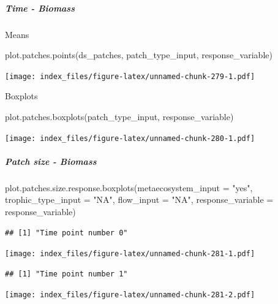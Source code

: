 \documentclass[
]{article}
\newenvironment{Shaded}{\begin{snugshade}}{\end{snugshade}}
\newcommand{\AttributeTok}[1]{\textcolor[rgb]{0.77,0.63,0.00}{#1}}
\newcommand{\FunctionTok}[1]{\textcolor[rgb]{0.00,0.00,0.00}{#1}}
\newcommand{\NormalTok}[1]{#1}
\newcommand{\StringTok}[1]{\textcolor[rgb]{0.31,0.60,0.02}{#1}}
\begin{document}
\hypertarget{time---biomass-1}{%
\subparagraph{Time - Biomass}\label{time---biomass-1}}

Means

\begin{Shaded}
\begin{Highlighting}[]
\FunctionTok{plot.patches.points}\NormalTok{(ds\_patches, patch\_type\_input,}
\NormalTok{                    response\_variable)}
\end{Highlighting}
\end{Shaded}

\texttt{[image: index\_files/figure-latex/unnamed-chunk-279-1.pdf]}

Boxplots

\begin{Shaded}
\begin{Highlighting}[]
\FunctionTok{plot.patches.boxplots}\NormalTok{(patch\_type\_input,}
\NormalTok{                       response\_variable)}
\end{Highlighting}
\end{Shaded}

\texttt{[image: index\_files/figure-latex/unnamed-chunk-280-1.pdf]}

\hypertarget{patch-size---biomass-2}{%
\subparagraph{Patch size - Biomass}\label{patch-size---biomass-2}}

\begin{Shaded}
\begin{Highlighting}[]
\FunctionTok{plot.patches.size.response.boxplots}\NormalTok{(}\AttributeTok{metaecosystem\_input =} \StringTok{"yes"}\NormalTok{,}
                                  \AttributeTok{trophic\_type\_input =} \StringTok{"NA"}\NormalTok{,}
                                  \AttributeTok{flow\_input =} \StringTok{"NA"}\NormalTok{,}
                                  \AttributeTok{response\_variable =}\NormalTok{ response\_variable)}
\end{Highlighting}
\end{Shaded}

\begin{verbatim}
## [1] "Time point number 0"
\end{verbatim}

\texttt{[image: index\_files/figure-latex/unnamed-chunk-281-1.pdf]}

\begin{verbatim}
## [1] "Time point number 1"
\end{verbatim}

\texttt{[image: index\_files/figure-latex/unnamed-chunk-281-2.pdf]}
\end{document}

